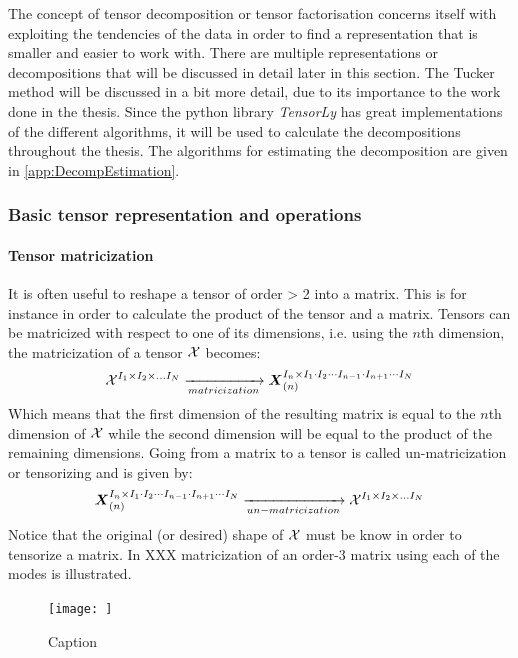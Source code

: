 The concept of tensor decomposition or tensor factorisation concerns itself with exploiting the tendencies of the data in order to find a representation that is smaller and easier to work with. There are multiple representations or decompositions that will be discussed in detail later in this section. The Tucker method will be discussed in a bit more detail, due to its importance to the work done in the thesis. Since the python library \textit{TensorLy} has great implementations of the different algorithms, it will be used to calculate the decompositions throughout the thesis. The algorithms for estimating the decomposition are given in \autoref{app:DecompEstimation}.

\subsubsection{Basic tensor representation and operations} \label{tex:tensor_operations}
\paragraph{Tensor matricization}
It is often useful to reshape a tensor of order > 2 into a matrix. This is for instance in order to calculate the product of the tensor and a matrix. Tensors can be matricized with respect to one of its dimensions, i.e. using the $n$th dimension, the matricization of a tensor $\mathcal{X}$ becomes:
\begin{equation}
    \mathcal{X}^{I_1 \times I_2 \times \dots I_N} \xrightarrow[matricization]{} \boldsymbol{X}_{(n)}^{I_n \times I_1 \cdot I_2 \cdots I_{n-1} \cdot I_{n+1} \cdots I_N}
\end{equation}
Which means that the first dimension of the resulting matrix is equal to the $n$th dimension of $\mathcal{X}$ while the second dimension will be equal to the product of the remaining dimensions. Going from a matrix to a tensor is called un-matricization or tensorizing and is given by:
\begin{equation}
      \boldsymbol{X}_{(n)}^{I_n \times I_1 \cdot I_2 \cdots I_{n-1} \cdot I_{n+1} \cdots I_N} \xrightarrow[un-matricization]{} \mathcal{X}^{I_1 \times I_2 \times \dots I_N}
\end{equation}
Notice that the original (or desired) shape of $\mathcal{X}$ must be know in order to tensorize a matrix. In XXX matricization of an order-3 matrix using each of the modes is illustrated.
\begin{figure}
    \centering
    \texttt{[image: ]}
    \caption{Caption}
    \label{fig:my_label}
\end{figure}


